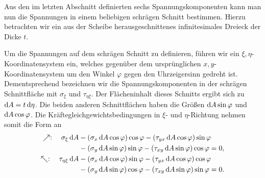 \documentclass{lecture}
\begin{document}
    Aus den im letzten Abschnitt definierten sechs Spannungskomponenten kann man nun die Spannungen in einem beliebigen schrägen Schnitt bestimmen.
    Hierzu betrachten wir ein aus der Scheibe herausgeschnittenes infinitesimales Dreieck der Dicke \(t\).
    \begin{center}
    \end{center}
    Um die Spannungen auf dem schrägen Schnitt zu definieren, führen wir ein \(\xi, \eta\)-Koordinatensystem ein, welches gegenüber dem ursprünglichen \(x, y\)-Koordinatensystem um den Winkel \(\varphi\) gegen den Uhrzeigersinn gedreht ist.
    Dementsprechend bezeichnen wir die Spannungskomponenten in der schrägen Schnittfläche mit \(\sigma_\xi\) und \(\tau_{\eta\xi}\).
    Der Flächeninhalt dieses Schnitts ergibt sich zu \(\mathop{\mathrm{d}\!} A = t\mathop{\mathrm{d}\!}\eta\).
    Die beiden anderen Schnittflächen haben die Größen \(\mathop{\mathrm{d}\!} A\sin\varphi\) und \(\mathop{\mathrm{d}\!} A\cos\varphi\).
    Die Kräftegleichgewichtsbedingungen in \(\xi\)- und \(\eta\)-Richtung nehmen somit die Form an
    \begin{align*}
        \nearrow: \quad \sigma_\xi \d A &- \parentheses*{\sigma_x \d A\cos\varphi}\cos\varphi - \parentheses*{\tau_{yx} \d A\cos\varphi}\sin\varphi\\
        &- \parentheses*{\sigma_y \d A\sin\varphi}\sin\varphi - \parentheses*{\tau_{xy} \d A\sin\varphi}\cos\varphi = 0,\\
        \nwarrow: \quad \tau_{\eta\xi} \d A &- \parentheses*{\sigma_x \d A\cos\varphi}\sin\varphi - \parentheses*{\tau_{yx} \d A\cos\varphi}\cos\varphi\\
        &- \parentheses*{\sigma_y \d A\sin\varphi}\cos\varphi - \parentheses*{\tau_{xy} \d A\sin\varphi}\sin\varphi = 0.
    \end{align*}
\end{document}

